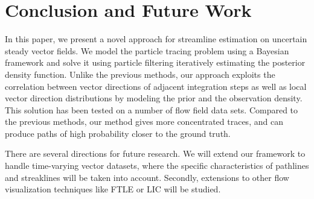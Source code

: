 \section{Conclusion and Future Work}

In this paper, we present a novel approach for streamline estimation on uncertain steady vector fields. We model the particle tracing problem using a Bayesian framework and solve it using particle filtering iteratively estimating the posterior density function. Unlike the previous methods, our approach exploits the correlation between vector directions of adjacent integration steps as well as local vector direction distributions by modeling the prior and the observation density. This solution has been tested on a number of flow field data sets. Compared to the previous methods, our method gives more concentrated traces, and can produce paths of high probability closer to the ground truth.

There are several directions for future research. We will extend our framework to handle time-varying vector datasets, where the specific characteristics of pathlines and streaklines will be taken into account. Secondly, extensions to other flow visualization techniques like FTLE or LIC will be studied.
